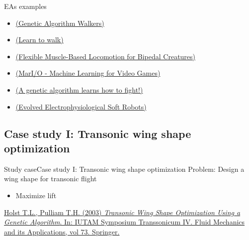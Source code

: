\documentclass[10pt,compress]{beamer} %
\begin{document}
\begin{frame}{EAs examples}
	\begin{itemize}
		\item \href{http://rednuht.org/genetic\_walkers/} {(Genetic Algorithm Walkers)}
		\item \href{https://www.youtube.com/watch?v=xcIBoPuNIiw}{(Learn to walk)}
		\item \href{https://www.youtube.com/watch?v=pgaEE27nsQw}{(Flexible Muscle-Based Locomotion for Bipedal Creatures)}
		\item \href{https://www.youtube.com/watch?v=qv6UVOQ0F44}{(MarI/O - Machine Learning for Video Games)}
		\item \href{https://www.youtube.com/watch?v=u2t77mQmJiY}{(A genetic algorithm learns how to fight!)}
		\item \href{https://www.youtube.com/watch?v=HgWQ-gPIvt4}{(Evolved Electrophysiological Soft Robots)}
	\end{itemize}
\end{frame}

\subsection{Case study I: Transonic wing shape optimization}
\begin{frame}{Study case}{Case study I: Transonic wing shape optimization}
    Problem: Design a wing shape for transonic flight
        \begin{itemize}
        \item Maximize lift
        \end{itemize}

    \setlength{\fboxrule}{0pt}
    \centering {} 
    
    \small
    \begin{flushleft}
    \href{https://link.springer.com/chapter/10.1007/978-94-010-0017-8\_38\#citeas}{Holst T.L., Pulliam T.H. (2003) \textit{Transonic Wing Shape Optimization Using a Genetic Algorithm}. In: IUTAM Symposium Transsonicum IV. Fluid Mechanics and its Applications, vol 73. Springer.}
    \end{flushleft}
\end{frame}

\end{document}
